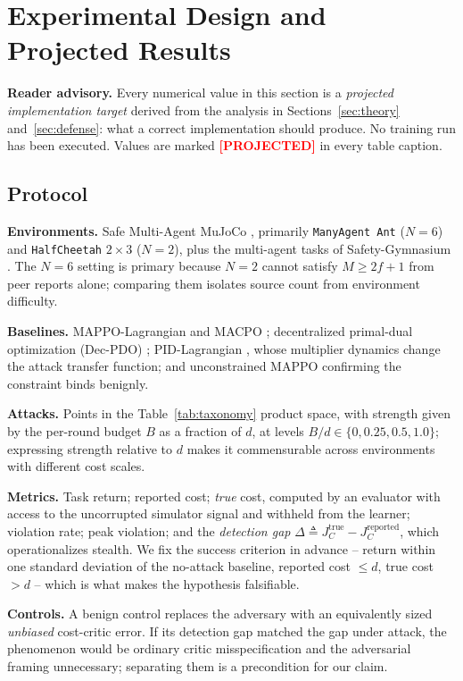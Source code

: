 \documentclass{article}
\newcommand{\projected}{\textcolor{red}{\textbf{[PROJECTED]}}}
\begin{document}
\section{Experimental Design and Projected Results}
\label{sec:exp}

\textbf{Reader advisory.} Every numerical value in this section is a \emph{projected implementation target} derived from the analysis in Sections~\ref{sec:theory} and~\ref{sec:defense}: what a correct implementation should produce. No training run has been executed. Values are marked \projected{} in every table caption.

\subsection{Protocol}

\textbf{Environments.} Safe Multi-Agent MuJoCo \citep{gu2023macpo}, primarily \texttt{ManyAgent Ant} ($N=6$) and \texttt{HalfCheetah} $2\times3$ ($N=2$), plus the multi-agent tasks of Safety-Gymnasium \citep{ji2023safetygym}. The $N=6$ setting is primary because $N=2$ cannot satisfy $M\ge 2f+1$ from peer reports alone; comparing them isolates source count from environment difficulty.

\textbf{Baselines.} MAPPO-Lagrangian and MACPO \citep{gu2023macpo}; decentralized primal-dual optimization (Dec-PDO) \citep{lu2021decentralized}; PID-Lagrangian \citep{stooke2020pid}, whose multiplier dynamics change the attack transfer function; and unconstrained MAPPO \citep{yu2022mappo} confirming the constraint binds benignly.

\textbf{Attacks.} Points in the Table~\ref{tab:taxonomy} product space, with strength given by the per-round budget $B$ as a fraction of $d$, at levels $B/d \in \{0, 0.25, 0.5, 1.0\}$; expressing strength relative to $d$ makes it commensurable across environments with different cost scales.

\textbf{Metrics.} Task return; reported cost; \emph{true} cost, computed by an evaluator with access to the uncorrupted simulator signal and withheld from the learner; violation rate; peak violation; and the \emph{detection gap} $\Delta \triangleq J^{\text{true}}_C - J^{\text{reported}}_C$, which operationalizes stealth. We fix the success criterion in advance -- return within one standard deviation of the no-attack baseline, reported cost $\le d$, true cost $> d$ -- which is what makes the hypothesis falsifiable.

\textbf{Controls.} A benign control replaces the adversary with an equivalently sized \emph{unbiased} cost-critic error. If its detection gap matched the gap under attack, the phenomenon would be ordinary critic misspecification \citep{skalse2022defining} and the adversarial framing unnecessary; separating them is a precondition for our claim.
\end{document}
